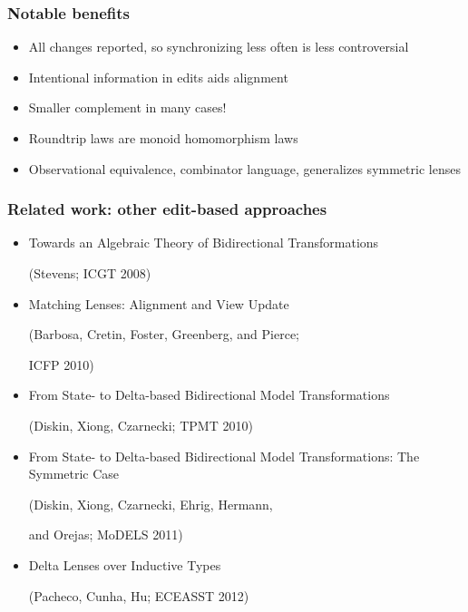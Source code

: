 \documentclass[14pt]{beamer}
\begin{document}
\begin{frame}
    \frametitle{Notable benefits}
    \begin{itemize}
        \item All changes reported, so synchronizing less often is less controversial
        \item Intentional information in edits aids alignment
        \item Smaller complement in many cases!
        \item Roundtrip laws are monoid homomorphism laws
            \pause
        \item Observational equivalence, combinator language, generalizes
            symmetric lenses
    \end{itemize}
\end{frame}

\begin{frame}
    \frametitle{Related work: other edit-based approaches}
    \begin{itemize}
        \small
        \item Towards an Algebraic Theory of Bidirectional Transformations

            \quad (Stevens; ICGT 2008)
        \item Matching Lenses: Alignment and View Update

            \quad (Barbosa, Cretin, Foster, Greenberg, and Pierce;

            \quad ICFP 2010)
        \item From State- to Delta-based Bidirectional Model Transformations

            \quad (Diskin, Xiong, Czarnecki; TPMT 2010)
        \item From State- to Delta-based Bidirectional Model
            Transformations: The Symmetric Case

            \quad (Diskin, Xiong, Czarnecki, Ehrig, Hermann,

            \quad and Orejas; MoDELS 2011)
        \item Delta Lenses over Inductive Types

            \quad (Pacheco, Cunha, Hu; ECEASST 2012)
    \end{itemize}
\end{frame}
\end{document}
